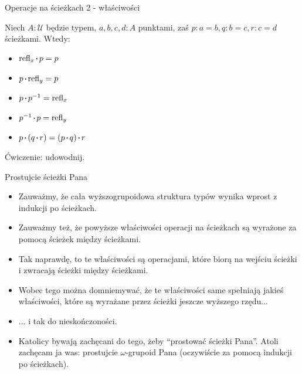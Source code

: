 \documentclass{beamer}
\newcommand{\U}{\mathcal{U}}
\newcommand{\refl}[1]{\text{refl}_{#1}}
\newcommand{\inv}[1]{#1^{-1}}
\newcommand{\sq}{\mathbin{\vcenter{\hbox{\rule{.3ex}{.3ex}}}}}
\begin{document}
\begin{frame}{Operacje na ścieżkach 2 - właściwości}

\begin{theorem}

Niech $A : \U$ będzie typem, $a, b, c, d : A$ punktami, zaś $p : a = b, q : b = c, r : c = d$ ścieżkami. Wtedy:

\begin{itemize}
	\item $\refl{x} \sq p = p$
	\item $p \sq \refl{y} = p$
	\item $p \sq \inv{p} = \refl{x}$
	\item $\inv{p} \sq p = \refl{y}$
	\item $p \sq (q \sq r) = (p \sq q) \sq r$
\end{itemize}

\end{theorem}

Ćwiczenie: udowodnij.

\end{frame}

\begin{frame}{Prostujcie ścieżki Pana}
\begin{itemize}
	\item Zauważmy, że cała wyższogrupoidowa struktura typów wynika wprost z indukcji po ścieżkach.
	\item Zauważmy też, że powyższe właściwości operacji na ścieżkach są wyrażone za pomocą ścieżek między ścieżkami.
	\item Tak naprawdę, to te właściwości są operacjami, które biorą na wejściu ścieżki i zwracają ścieżki między ścieżkami.
	\item Wobec tego można domniemywać, że te właściwości same spełniają jakieś właściwości, które są wyrażane przez ścieżki jeszcze wyższego rzędu...
	\item ... i tak do nieskończoności.
	\item Katolicy bywają zachęcani do tego, żeby ``prostować ścieżki Pana''. Atoli zachęcam ja was: prostujcie $\omega$-grupoid Pana (oczywiście za pomocą indukcji po ścieżkach).
\end{itemize}
\end{frame}
\end{document}
